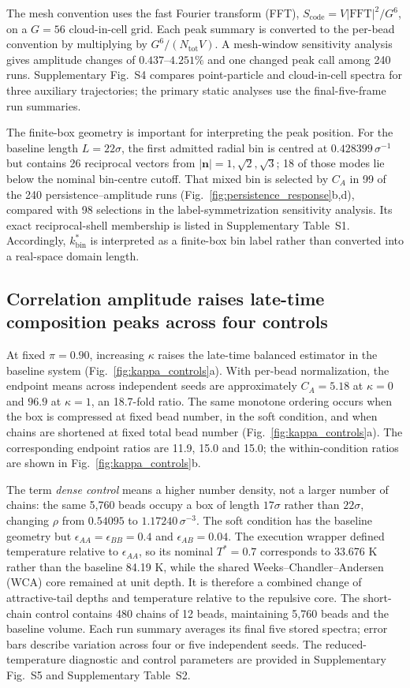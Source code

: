 \documentclass[pdflatex,sn-nature,onecolumn]{sn-jnl}
\begin{document}
The mesh convention uses the fast Fourier transform (FFT), $S_{\mathrm{code}}=V|\mathrm{FFT}|^2/G^6$, on a $G=56$ cloud-in-cell grid. Each peak summary is converted to the per-bead convention by multiplying by $G^6/(N_{\mathrm{tot}}V)$. A mesh-window sensitivity analysis gives amplitude changes of $0.437$--$4.251\%$ and one changed peak call among 240 runs. Supplementary Fig.~S4 compares point-particle and cloud-in-cell spectra for three auxiliary trajectories; the primary static analyses use the final-five-frame run summaries.

The finite-box geometry is important for interpreting the peak position. For the baseline length $L=22\sigma$, the first admitted radial bin is centred at $0.428399\,\sigma^{-1}$ but contains 26 reciprocal vectors from $|\bm{n}|=1,\sqrt{2},\sqrt{3}$; 18 of those modes lie below the nominal bin-centre cutoff. That mixed bin is selected by $C_A$ in 99 of the 240 persistence--amplitude runs (Fig.~\ref{fig:persistence_response}b,d), compared with 98 selections in the label-symmetrization sensitivity analysis. Its exact reciprocal-shell membership is listed in Supplementary Table~S1. Accordingly, $k_{\mathrm{bin}}^*$ is interpreted as a finite-box bin label rather than converted into a real-space domain length.

\subsection{Correlation amplitude raises late-time composition peaks across four controls}

At fixed $\pi=0.90$, increasing $\kappa$ raises the late-time balanced estimator in the baseline system (Fig.~\ref{fig:kappa_controls}a). With per-bead normalization, the endpoint means across independent seeds are approximately $C_A=5.18$ at $\kappa=0$ and $96.9$ at $\kappa=1$, an 18.7-fold ratio. The same monotone ordering occurs when the box is compressed at fixed bead number, in the soft condition, and when chains are shortened at fixed total bead number (Fig.~\ref{fig:kappa_controls}a). The corresponding endpoint ratios are 11.9, 15.0 and 15.0; the within-condition ratios are shown in Fig.~\ref{fig:kappa_controls}b.

The term \emph{dense control} means a higher number density, not a larger number of chains: the same 5,760 beads occupy a box of length $17\sigma$ rather than $22\sigma$, changing $\rho$ from $0.54095$ to $1.17240\,\sigma^{-3}$. The soft condition has the baseline geometry but $\epsilon_{AA}=\epsilon_{BB}=0.4$ and $\epsilon_{AB}=0.04$. The execution wrapper defined temperature relative to $\epsilon_{AA}$, so its nominal $T^*=0.7$ corresponds to 33.676 K rather than the baseline 84.19 K, while the shared Weeks--Chandler--Andersen (WCA) core remained at unit depth. It is therefore a combined change of attractive-tail depths and temperature relative to the repulsive core. The short-chain control contains 480 chains of 12 beads, maintaining 5,760 beads and the baseline volume. Each run summary averages its final five stored spectra; error bars describe variation across four or five independent seeds. The reduced-temperature diagnostic and control parameters are provided in Supplementary Fig.~S5 and Supplementary Table~S2.
\end{document}
